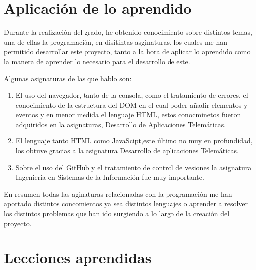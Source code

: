 \documentclass[a4paper, 12pt]{book}
\begin{document}
\section{Aplicación de lo aprendido}
\label{sec:aplicacion}

Durante la realización del grado, he obtenido conocimiento sobre distintos temas, una de ellas la programación, en disitintas asginaturas, los cuales me han permitido desarrollar este proyecto, tanto a la hora de aplicar lo aprendido como la manera de aprender lo necesario para el desarrollo de este.

Algunas asignaturas de las que hablo son:
\begin{enumerate}
  \item El uso del navegador, tanto de la consola, como el tratamiento de errores, el conocimiento de la estructura del DOM en el cual poder añadir elementos y eventos y en menor medida el lenguaje HTML, estos conocminetos fueron adquiridos en la asignaturas, Desarrollo de Aplicaciones Telemáticas.
  \item El lenguaje tanto HTML como JavaScipt,este último no muy en profundidad, los obtuve gracias a la asignatura Desarrollo de aplicaciones Telemáticas.
  \item Sobre el uso del GitHub y el tratamiento de control de vesiones la asignatura Ingeniería en Sistemas de la Información fue muy importante.
\end{enumerate}
En resumen todas las aginaturas relacionadas con la programación me han aportado distintos concomientos ya sea distintos lenguajes o aprender a resolver los distintos problemas que han ido surgiendo a lo largo de la creación del proyecto.


\section{Lecciones aprendidas}
\label{sec:lecciones_aprendidas}
\end{document}
